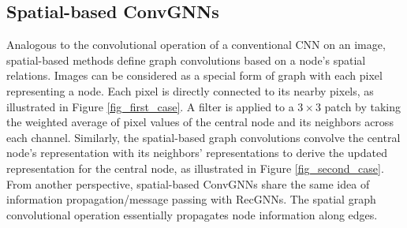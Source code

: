     \subsection{Spatial-based ConvGNNs}
    \label{sec:spatial_gcn}
    Analogous to the convolutional operation of a conventional CNN on an image, spatial-based methods define graph convolutions based on a node's spatial relations. Images can be considered as a special form of graph with each pixel representing a node. 
    Each pixel is directly connected to its nearby pixels, as illustrated in Figure \ref{fig_first_case}.  A filter is applied to a $3\times 3$ patch by taking the weighted average of pixel values of the central node and its neighbors across each channel. Similarly, the spatial-based graph convolutions convolve the central node's representation with its neighbors' representations to derive the updated representation for the central node, as illustrated in Figure \ref{fig_second_case}. From another perspective, spatial-based ConvGNNs share the same idea of information propagation/message passing with RecGNNs. The spatial graph convolutional operation essentially propagates node information along edges. 
   
